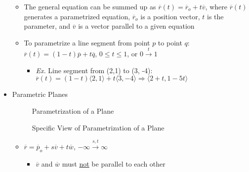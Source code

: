\begin{itemize}
\begin{itemize}
        \item The general equation can be summed up as $\overline{r}(t) = \overline{r}_o + t\overline{v}$, where $\overline{r}(t)$ generates a parametrized equation, $\overline{r}_o$ is a position vector, $t$ is the parameter, and $\overline{v}$ is a vector parallel to a given equation
          
        \item To parametrize a line segment from point $p$ to point $q$:\\$\overline{r}(t) = (1-t)\overline{p} + t\overline{q}$, $0\leq t\leq 1$, or $0\xrightarrow{t}1$

          \begin{itemize}

            \item \textit{Ex.} Line segment from (2,1) to (3, -4):\\ $\overline{r}(t)=(1-t)\langle 2, 1 \rangle + t\langle 3, -4\rangle\Rightarrow \langle 2+t, 1-5t \rangle$

          \end{itemize}

      \end{itemize}

      \newpage

    \item Parametric Planes

      \begin{figure}[h!]
        \centering 
        \caption{Parametrization of a Plane}
      \end{figure}

      \begin{figure}[h!]
        \centering 
        \caption{Specific View of Parametrization of a Plane}
      \end{figure}

      \begin{itemize}

        \item $\overline{r}=\overline{p}_o + s\overline{v} + t\overline{w}$, $-\infty \xrightarrow{s,t} \infty$

          \begin{itemize}

            \item $\overline{v}$ and $\overline{w}$ must \underline{not} be parallel to each other

          \end{itemize}


\end{itemize}
\end{itemize}
